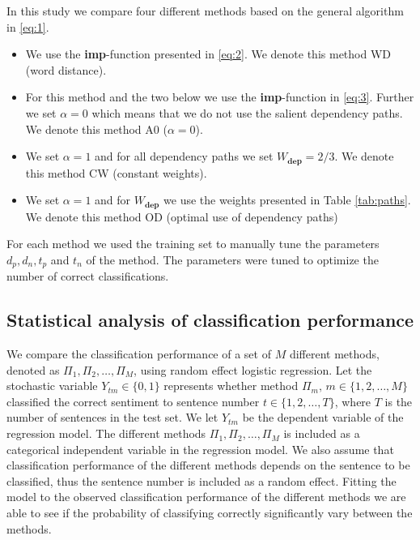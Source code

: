 \documentclass[11pt]{article}
\begin{document}
In this study we compare four different methods based on the general algorithm in \eqref{eq:1}.
\begin{itemize}
\item We use the \textbf{imp}-function presented in \eqref{eq:2}. We denote this method WD (word distance).
\item For this method and the two below we use the \textbf{imp}-function in \eqref{eq:3}. Further we set $\alpha = 0$ which means that we do not use the salient dependency paths. We denote this method A0 ($\alpha = 0$).
\item We set $\alpha = 1$ and for all dependency paths we set $W_{\mathbf{dep}} = 2/3$. We denote this method CW (constant weights).
\item We set $\alpha = 1$ and for $W_{\mathbf{dep}}$ we use the weights presented in Table \ref{tab:paths}. We denote this method OD (optimal use of dependency paths)
\end{itemize}
For each method we used the training set to manually tune the parameters $d_p, d_n, t_p$ and $t_n$ of the method. The parameters were tuned to optimize the number of correct classifications.

\subsection{Statistical analysis of classification performance}
\label{sec:sa}

We compare the classification performance of a set of $M$ different methods, denoted as $\Pi_1, \Pi_2, \ldots, \Pi_M$, using random effect logistic regression. Let the stochastic variable $Y_{tm} \in \{0,1\}$ represents whether method $\Pi_m, \, m \in \{1,2,\ldots,M\}$ classified the correct sentiment to sentence number $t \in \{1,2,\ldots,T\}$, where $T$ is the number of sentences in the test set. We let $Y_{tm}$ be the dependent variable of the regression model. The different methods $\Pi_1, \Pi_2, \ldots, \Pi_M$ is included as a categorical independent variable in the regression model. We also assume that classification performance of the different methods depends on the sentence to be classified, thus the sentence number is included as a random effect. 
Fitting the model to the observed classification performance of the different methods we are able to see if the probability of classifying correctly significantly vary between the methods.
\end{document}
